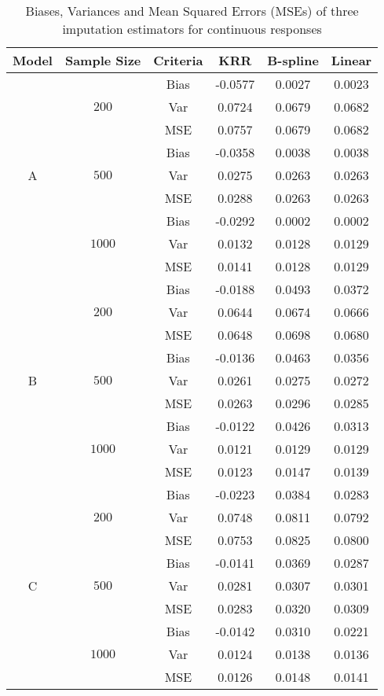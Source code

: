\documentclass[12pt]{article}
\begin{document}
\begin{table}[!ht]
\centering
\caption{Biases, Variances and Mean Squared Errors (MSEs) of three imputation estimators for continuous responses}\label{MAR, linear, comparison}
{
\begin{tabular}{cccccc}
  \hline
Model & Sample Size & Criteria & KRR & B-spline & Linear  \\ 
  \hline
 \multirow{9}{*}{A}& \multirow{3}{*}{$200$} & Bias & -0.0577 & 0.0027 & 0.0023 \\ 
 & & Var & 0.0724 & 0.0679 & 0.0682 \\ 
 & & MSE & 0.0757 & 0.0679 & 0.0682 \\ 
 \cline{3-6}
 &\multirow{3}{*}{$500$} & Bias & -0.0358 & 0.0038 & 0.0038 \\ 
 & & Var & 0.0275 & 0.0263 & 0.0263 \\ 
 & & MSE & 0.0288 & 0.0263 & 0.0263 \\
 \cline{3-6} 
 &\multirow{3}{*}{$1000$} & Bias & -0.0292 & 0.0002 & 0.0002 \\ 
 & & Var & 0.0132 & 0.0128 & 0.0129 \\ 
 & & MSE & 0.0141 & 0.0128 & 0.0129 \\
   \hline
\multirow{9}{*}{B} &  \multirow{3}{*}{$200$} & Bias & -0.0188 & 0.0493 & 0.0372 \\ 
 & & Var & 0.0644 & 0.0674 & 0.0666 \\ 
 & & MSE & 0.0648 & 0.0698 & 0.0680 \\ 
  \cline{3-6} 
 &\multirow{3}{*}{$500$} & Bias & -0.0136 & 0.0463 & 0.0356 \\ 
 & & Var & 0.0261 & 0.0275 & 0.0272 \\ 
 & & MSE & 0.0263 & 0.0296 & 0.0285 \\ 
  \cline{3-6} 
 &\multirow{3}{*}{$1000$} & Bias & -0.0122 & 0.0426 & 0.0313 \\ 
 & & Var & 0.0121 & 0.0129 & 0.0129 \\ 
 & & MSE & 0.0123 & 0.0147 & 0.0139 \\ 
\hline
  \multirow{9}{*}{C} &  \multirow{3}{*}{$200$}& Bias & -0.0223 & 0.0384 & 0.0283 \\ 
 & & Var & 0.0748 & 0.0811 & 0.0792 \\ 
 & & MSE & 0.0753 & 0.0825 & 0.0800 \\ 
 \cline{3-6}
 &\multirow{3}{*}{$500$} & Bias & -0.0141 & 0.0369 & 0.0287 \\ 
 & & Var & 0.0281 & 0.0307 & 0.0301 \\ 
 & & MSE & 0.0283 & 0.0320 & 0.0309 \\ 
 \cline{3-6}
 &\multirow{3}{*}{$1000$} & Bias & -0.0142 & 0.0310 & 0.0221 \\ 
 & & Var & 0.0124 & 0.0138 & 0.0136 \\ 
 & & MSE & 0.0126 & 0.0148 & 0.0141 \\ 
 \hline
\end{tabular}
}
\end{table}
\end{document}
